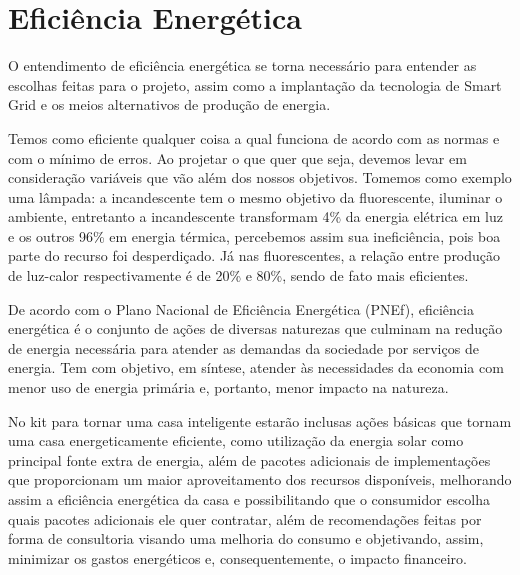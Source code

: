 \section{Eficiência Energética}
\par O entendimento de eficiência energética se torna necessário para entender as escolhas feitas para o projeto, assim como a implantação da tecnologia de Smart Grid e os meios alternativos de produção de energia.
\par Temos como eficiente qualquer coisa a qual funciona de acordo com as normas e com o mínimo de erros. Ao projetar o que quer que seja, devemos levar em consideração variáveis que vão além dos nossos objetivos. Tomemos como exemplo uma lâmpada: a incandescente tem o mesmo objetivo da fluorescente, iluminar o ambiente, entretanto a incandescente transformam 4\% da energia elétrica em luz e os outros 96\% em energia térmica, percebemos assim sua ineficiência, pois boa parte do recurso foi desperdiçado. Já nas fluorescentes, a relação entre produção de luz-calor respectivamente é de 20\% e 80\%, sendo de fato mais eficientes.
\par De acordo com o Plano Nacional de Eficiência Energética (PNEf), eficiência energética é o conjunto de ações de diversas naturezas que culminam na redução de energia necessária para atender as demandas da sociedade por serviços de energia. Tem com objetivo, em síntese, atender às necessidades da economia com menor uso de energia primária e, portanto, menor impacto na natureza.
\par No kit para tornar uma casa inteligente estarão inclusas ações básicas que tornam uma casa energeticamente eficiente, como utilização da energia solar como principal fonte extra de energia, além de pacotes adicionais de implementações que proporcionam um maior aproveitamento dos recursos disponíveis, melhorando assim a eficiência energética da casa e possibilitando que o consumidor escolha quais pacotes adicionais ele quer contratar, além de recomendações feitas por forma de consultoria visando uma melhoria do consumo e objetivando, assim, minimizar os gastos energéticos e, consequentemente, o impacto financeiro.

